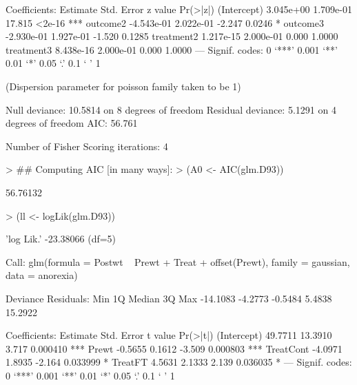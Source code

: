 \documentclass{article}
\begin{document}
\begin{Schunk}
\begin{Soutput}
Coefficients:
              Estimate Std. Error z value Pr(>|z|)    
(Intercept)  3.045e+00  1.709e-01  17.815   <2e-16 ***
outcome2    -4.543e-01  2.022e-01  -2.247   0.0246 *  
outcome3    -2.930e-01  1.927e-01  -1.520   0.1285    
treatment2   1.217e-15  2.000e-01   0.000   1.0000    
treatment3   8.438e-16  2.000e-01   0.000   1.0000    
---
Signif. codes:  0 ‘***’ 0.001 ‘**’ 0.01 ‘*’ 0.05 ‘.’ 0.1 ‘ ’ 1

(Dispersion parameter for poisson family taken to be 1)

    Null deviance: 10.5814  on 8  degrees of freedom
Residual deviance:  5.1291  on 4  degrees of freedom
AIC: 56.761

Number of Fisher Scoring iterations: 4
\end{Soutput}
\begin{Sinput}
> ## Computing AIC [in many ways]:
> (A0 <- AIC(glm.D93))
\end{Sinput}
\begin{Soutput}
[1] 56.76132
\end{Soutput}
\begin{Sinput}
> (ll <- logLik(glm.D93))
\end{Sinput}
\begin{Soutput}
'log Lik.' -23.38066 (df=5)
\end{Soutput}
\begin{Soutput}
Call:
glm(formula = Postwt ~ Prewt + Treat + offset(Prewt), family = gaussian, 
    data = anorexia)

Deviance Residuals: 
     Min        1Q    Median        3Q       Max  
-14.1083   -4.2773   -0.5484    5.4838   15.2922  

Coefficients:
            Estimate Std. Error t value Pr(>|t|)    
(Intercept)  49.7711    13.3910   3.717 0.000410 ***
Prewt        -0.5655     0.1612  -3.509 0.000803 ***
TreatCont    -4.0971     1.8935  -2.164 0.033999 *  
TreatFT       4.5631     2.1333   2.139 0.036035 *  
---
Signif. codes:  0 ‘***’ 0.001 ‘**’ 0.01 ‘*’ 0.05 ‘.’ 0.1 ‘ ’ 1


\end{Soutput}
\end{Schunk}
\end{document}
